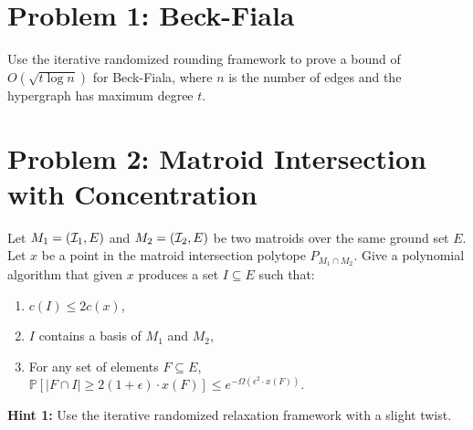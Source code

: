 

\renewcommand{\P}[1]{{\mathbb{P}}\left[#1\right]}
\renewcommand{\PP}[2]{{\mathbb{P}}_{#1}\left[#2\right]}
\renewcommand{\E}[1]{{\mathbb{E}}\left[#1\right]}
\renewcommand{\EE}[2]{{\mathbb{E}}_{#1}\left[#2\right]}
\renewcommand{\R}{\ensuremath{\mathbb R}}
\renewcommand{\Z}{\ensuremath{\mathbb Z}}
\def\cI{{\cal I}}



\noindent
   \begin{center}
   \end{center}

\pagestyle{empty}

\vspace*{3mm}
\noindent {\large \textcolor{purple}{Do at least two of the following three problems.}}

\section{Problem 1: Beck-Fiala}

Use the iterative randomized rounding framework to prove a bound of $O(\sqrt{t \log n})$ for Beck-Fiala, where $n$ is the number of edges and the hypergraph has maximum degree $t$. 

\section{Problem 2: Matroid Intersection with Concentration}

Let $M_1=(\cI_1,E)$ and $M_2=(\cI_2,E)$ be two matroids over the same ground set $E$. Let $x$ be a point in the matroid intersection polytope $P_{M_1 \cap M_2}$. Give a polynomial algorithm that given $x$ produces a set $I \subseteq E$ such that:
\begin{enumerate}
	\item $c(I) \le 2c(x)$,
	\item $I$ contains a basis of $M_1$ and $M_2$,
	\item For any set of elements $F \subseteq E$, $\P{|F \cap I| \ge 2(1+\epsilon) \cdot  x(F)} \le e^{-\Omega(\epsilon^2 \cdot x(F))}$.
\end{enumerate}
\textbf{Hint 1:} Use the iterative randomized relaxation framework with a slight twist.\\

